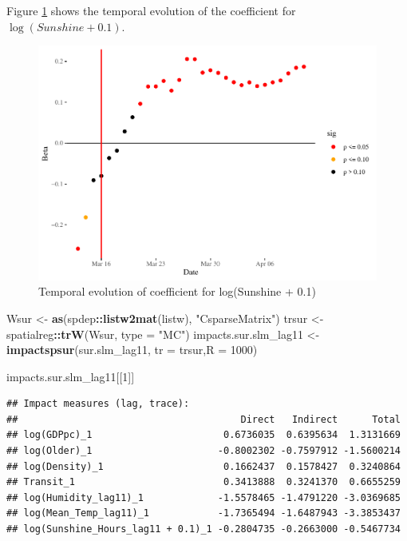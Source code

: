 \documentclass[]{elsarticle} %
\makeatletter
\newenvironment{Shaded}{\begin{snugshade}}{\end{snugshade}}
\newcommand{\DataTypeTok}[1]{\textcolor[rgb]{0.13,0.29,0.53}{#1}}
\newcommand{\DecValTok}[1]{\textcolor[rgb]{0.00,0.00,0.81}{#1}}
\newcommand{\KeywordTok}[1]{\textcolor[rgb]{0.13,0.29,0.53}{\textbf{#1}}}
\newcommand{\NormalTok}[1]{#1}
\newcommand{\OperatorTok}[1]{\textcolor[rgb]{0.81,0.36,0.00}{\textbf{#1}}}
\newcommand{\StringTok}[1]{\textcolor[rgb]{0.31,0.60,0.02}{#1}}
\def\maxwidth{\ifdim\Gin@nat@width>\linewidth\linewidth
\else\Gin@nat@width\fi}
\let\Oldincludegraphics\includegraphics
\renewcommand{\includegraphics}[1]{\Oldincludegraphics[width=\maxwidth]{#1}}
\makeatother
\begin{document}
Figure \ref{fig:beta-sunshine-time} shows the temporal evolution of the
coefficient for \(\log(Sunshine + 0.1)\).

\begin{figure}
\centering
\includegraphics{Environmental-Correlates-of-COVID19-Spain_files/figure-latex/beta-sunshine-time-1.pdf}
\caption{\label{fig:beta-sunshine-time}Temporal evolution of coefficient
for log(Sunshine + 0.1)}
\end{figure}

\begin{Shaded}
\begin{Highlighting}[]
\NormalTok{Wsur <-}\StringTok{ }\KeywordTok{as}\NormalTok{(spdep}\OperatorTok{::}\KeywordTok{listw2mat}\NormalTok{(listw), }\StringTok{"CsparseMatrix"}\NormalTok{)}
\NormalTok{trsur <-}\StringTok{ }\NormalTok{spatialreg}\OperatorTok{::}\KeywordTok{trW}\NormalTok{(Wsur, }\DataTypeTok{type =} \StringTok{"MC"}\NormalTok{)}
\NormalTok{impacts.sur.slm_lag11 <-}\StringTok{ }\KeywordTok{impactspsur}\NormalTok{(sur.slm_lag11, }\DataTypeTok{tr =}\NormalTok{ trsur,}\DataTypeTok{R =} \DecValTok{1000}\NormalTok{)}

\NormalTok{impacts.sur.slm_lag11[[}\DecValTok{1}\NormalTok{]]}
\end{Highlighting}
\end{Shaded}

\begin{verbatim}
## Impact measures (lag, trace):
##                                       Direct   Indirect      Total
## log(GDPpc)_1                       0.6736035  0.6395634  1.3131669
## log(Older)_1                      -0.8002302 -0.7597912 -1.5600214
## log(Density)_1                     0.1662437  0.1578427  0.3240864
## Transit_1                          0.3413888  0.3241370  0.6655259
## log(Humidity_lag11)_1             -1.5578465 -1.4791220 -3.0369685
## log(Mean_Temp_lag11)_1            -1.7365494 -1.6487943 -3.3853437
## log(Sunshine_Hours_lag11 + 0.1)_1 -0.2804735 -0.2663000 -0.5467734
\end{verbatim}
\end{document}
